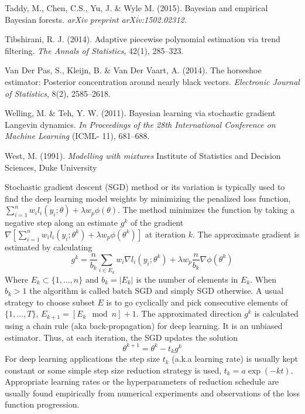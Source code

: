 \documentclass[12pt]{TD-CJS}
\begin{document}
\begin{thebibliography}{}
Taddy, M.,  Chen, C.S., Yu, J.  \&  Wyle M. (2015). Bayesian and empirical Bayesian forests. {\it arXiv preprint arXiv:1502.02312}.

Tibshirani, R. J. (2014). Adaptive piecewise polynomial estimation via trend filtering. {\it The Annals of Statistics}, 42(1), 285--323.

Van Der Pas, S., Kleijn, B.  \&  Van Der Vaart, A. (2014). The horseshoe estimator: Posterior concentration around nearly black vectors. {\it Electronic Journal of Statistics}, 8(2), 2585--2618.

Welling, M. \&  Teh, Y. W. (2011). Bayesian learning via stochastic gradient Langevin dynamics. {\it In Proceedings of the 28th International Conference on Machine Learning} (ICML- 11), 681--688.

West, M. (1991). {\it Modelling with mixtures} Institute of Statistics and Decision Sciences, Duke University
\end{thebibliography}


\begin{appendix}\label{SGD}
Stochastic gradient descent (SGD) method or its variation  is typically used to find the deep learning model weights by minimizing the penalized loss function, $\sum_{i=1}^n w_i l_i(y_i; \theta) + \lambda w_{p} \phi(\theta)$. The method minimizes the function by taking a negative step along an estimate $g^k$ of the gradient $\nabla\left[\sum_{i=1}^n w_i l_i(y_i; \theta^k) + \lambda w_{p} \phi(\theta^k)\right] $ at iteration $k$. 
The approximate gradient is estimated by calculating 
\[
g^k = \frac{n}{b_k} \sum_{i \in E_k} w_i\nabla  l_i(y_i; \theta^k) +  \lambda w_{p} \frac{n}{b_k}\nabla \phi(\theta^k)
\]
Where $E_k \subset \{1,\ldots,n \}$ and $b_k = |E_k|$ is the number of elements in $E_k$. When $b_k >1$ the algorithm is called batch SGD and simply SGD otherwise. A usual strategy to choose subset $E$ is to go cyclically and pick consecutive elements of $\{1,\ldots,T \}$, $E_{k+1} = [E_k \mod n]+1$. The approximated direction  $g^k$ is calculated using a chain rule (aka back-propagation) for deep learning. It  is an unbiased estimator. Thus, at each iteration, the SGD updates the solution
\[
\theta^{k+1} = \theta^k - t_k g^k
\]
For deep learning applications the step size $t_k$ (a.k.a learning rate) is usually kept constant or some simple step size reduction strategy is used, $t_k = a\exp(-kt)$. Appropriate learning rates or the hyperparameters of reduction schedule  are usually found empirically from numerical experiments and observations of the loss function progression. \\
\end{appendix}
\end{document}
